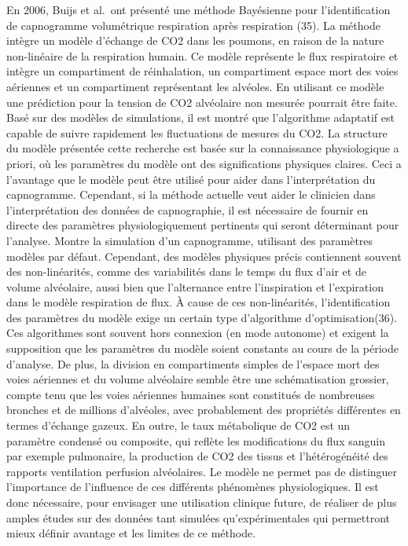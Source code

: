 \documentclass[12pt,]{article}
\begin{document}
En 2006, Buijs et al.~ont présenté une méthode Bayésienne pour
l'identification de capnogramme volumétrique respiration après
respiration (35). La méthode intègre un modèle d'échange de CO2 dans les
poumons, en raison de la nature non-linéaire de la respiration humain.
Ce modèle représente le flux respiratoire et intègre un compartiment de
réinhalation, un compartiment espace mort des voies aériennes et un
compartiment représentant les alvéoles. En utilisant ce modèle une
prédiction pour la tension de CO2 alvéolaire non mesurée pourrait être
faite. Basé sur des modèles de simulations, il est montré que
l'algorithme adaptatif est capable de suivre rapidement les fluctuations
de mesures du CO2. La structure du modèle présentée cette recherche est
basée sur la connaissance physiologique a priori, où les paramètres du
modèle ont des significations physiques claires. Ceci a l'avantage que
le modèle peut être utilisé pour aider dans l'interprétation du
capnogramme. Cependant, si la méthode actuelle veut aider le clinicien
dans l'interprétation des données de capnographie, il est nécessaire de
fournir en directe des paramètres physiologiquement pertinents qui
seront déterminant pour l'analyse. Montre la simulation d'un
capnogramme, utilisant des paramètres modèles par défaut. Cependant, des
modèles physiques précis contiennent souvent des non-linéarités, comme
des variabilités dans le temps du flux d'air et de volume alvéolaire,
aussi bien que l'alternance entre l'inspiration et l'expiration dans le
modèle respiration de flux. À cause de ces non-linéarités,
l'identification des paramètres du modèle exige un certain type
d'algorithme d'optimisation(36). Ces algorithmes sont souvent hors
connexion (en mode autonome) et exigent la supposition que les
paramètres du modèle soient constants au cours de la période d'analyse.
De plus, la division en compartiments simples de l'espace mort des voies
aériennes et du volume alvéolaire semble être une schématisation
grossier, compte tenu que les voies aériennes humaines sont constitués
de nombreuses bronches et de millions d'alvéoles, avec probablement des
propriétés différentes en termes d'échange gazeux. En outre, le taux
métabolique de CO2 est un paramètre condensé ou composite, qui reflète
les modifications du flux sanguin par exemple pulmonaire, la production
de CO2 des tissus et l'hétérogénéité des rapports ventilation perfusion
alvéolaires. Le modèle ne permet pas de distinguer l'importance de
l'influence de ces différents phénomènes physiologiques. Il est donc
nécessaire, pour envisager une utilisation clinique future, de réaliser
de plus amples études sur des données tant simulées qu'expérimentales
qui permettront mieux définir avantage et les limites de ce méthode.
\end{document}
